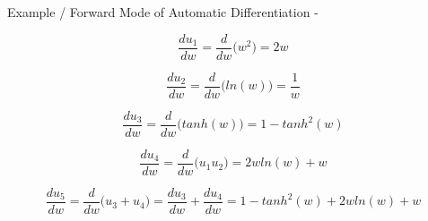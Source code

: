 \begin{frame}[t,allowframebreaks]{
    Example / Forward Mode of Automatic Differentiation -}
\begin{center}
  \end{center}
   
  \framebreak
   
   
  \vspace{-0.1cm}
   
  \begin{equation}
    \frac{d u_1}{d w} =  
    \frac{d}{dw} \Big(w^2\Big) = 2w
  \end{equation}
   
  \vspace{-0.1cm}
   
  \begin{equation}
    \frac{du_2}{dw} =  
    \frac{d}{dw} \Big( ln(w) \Big) = \frac{1}{w}
  \end{equation}
   
  \vspace{-0.1cm}
   
  \begin{equation}
    \frac{du_3}{dw} =  
    \frac{d}{dw} \Big( tanh(w) \Big) = 1-tanh^2(w)
  \end{equation}
   
  \vspace{-0.1cm}
   
  \begin{equation}
    \frac{du_4}{dw} =  
      \frac{d}{dw} \Big( u_1 u_2 \Big) = 
      2w ln(w) + w
  \end{equation}
   
  \vspace{-0.3cm}
   
  \begin{equation}
    \frac{du_5}{dw} =  
      \frac{d}{dw} \Big( u_3 + u_4 \Big) = 
      \frac{du_3}{dw} + \frac{du_4}{dw} =
      1-tanh^2(w) + 2w ln(w) + w
  \end{equation}
   

\end{frame}
